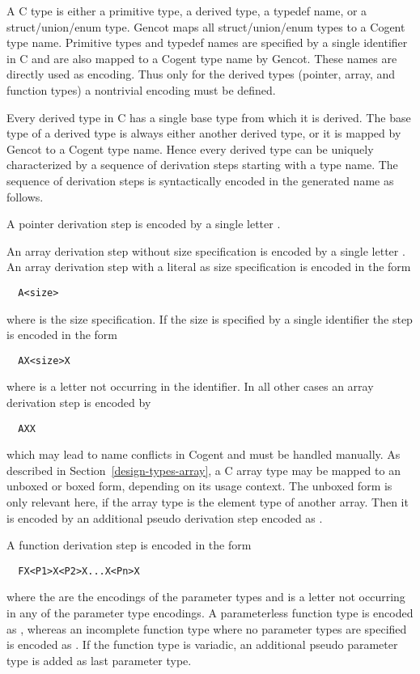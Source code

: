A C type is either a primitive type, a derived type, a typedef name, or a struct/union/enum type. Gencot maps all
struct/union/enum types to a Cogent type name. Primitive types and typedef names are specified by a single identifier
in C and are also mapped to a Cogent type name by Gencot. These names are directly used as encoding. Thus only for the 
derived types (pointer, array, and function types) a nontrivial encoding must be defined.

Every derived type in C has a single base type from which it is derived. The base type of a derived
type is always either another derived type, or it is mapped by Gencot to a Cogent type name. Hence every derived 
type can be uniquely characterized by a sequence of derivation steps starting with a type name. The sequence of 
derivation steps is syntactically encoded in the generated name as follows.

A pointer derivation step is encoded by a single letter . 

An array derivation step without size
specification is encoded by a single letter . An array derivation step with a literal
as size specification is encoded in the form
\begin{verbatim}
  A<size>
\end{verbatim}
where  is the size specification. If the size is specified by a single identifier the 
step is encoded in the form
\begin{verbatim}
  AX<size>X
\end{verbatim}
where  is a letter not occurring in the identifier.
In all other cases an array derivation step is encoded by
\begin{verbatim}
  AXX
\end{verbatim}
which may lead to name conflicts in Cogent and must be handled manually. As described in 
Section~\ref{design-types-array}, a C array type may be mapped to an unboxed or boxed form, depending
on its usage context. The unboxed form is only relevant here, if the array type is the element type 
of another array. Then it is encoded by an additional pseudo derivation step encoded as .

A function derivation step is encoded in the form
\begin{verbatim}
  FX<P1>X<P2>X...X<Pn>X
\end{verbatim}
where the  are the encodings of the parameter types and  is a letter not occurring in 
any of the parameter type encodings. A parameterless function type is encoded as , whereas an
incomplete function type where no parameter types are specified is encoded as .
If the function type is variadic, an additional pseudo parameter type 
is added as last parameter type. 

